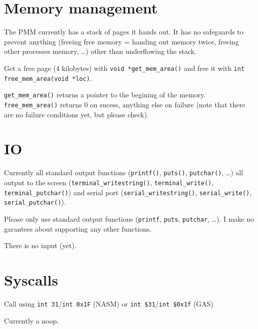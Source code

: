 \documentclass[12pt]{article}
\newcommand{\code}[1]{\colorbox{light-gray}{\texttt{#1}}}
\begin{document}
\section{Memory management}
\begin{list}{}{}
\item The PMM currently has a stack of pages it hands out. It has no safeguards to prevent anything (freeing free memory = handing out memory twice, freeing other processes memory, \ldots) other than underflowing the stack.
\item Get a free page (4 kilobytes) with \code{void *get\_mem\_area()} and free it with \code{int free\_mem\_area(void *loc)}.
\item \code{get\_mem\_area()} returns a pointer to the begining of the memory. \code{free\_mem\_area()} returns 0 on sucess, anything else on failure (note that there are no failure conditions yet, but please check).
\end{list}

\section{IO}
\begin{list}{}{}
\item Currently all standard output functions (\code{printf()}, \code{puts()}, \code{putchar()}, \ldots) all output to the screen (\code{terminal\_writestring()}, \code{terminal\_write()}, \code{terminal\_putchar()}) and serial port (\code{serial\_writestring()}, \code{serial\_write()}, \code{serial\_putchar()}).\linebreak
\begin{list}{}{}
\item Please only use standard output functions (\code{printf}, \code{puts}, \code{putchar}, \ldots). I make no garantees about supporting any other functions.
\end{list}
\item There is no input (yet).
\end{list}

\section{Syscalls}
\begin{list}{}{}
\item Call using \code{int 31}/\code{int 0x1F} (NASM) or \code{int \$31}/\code{int \$0x1f} (GAS)
\item Currently a noop.
\end{list}
\end{document}
